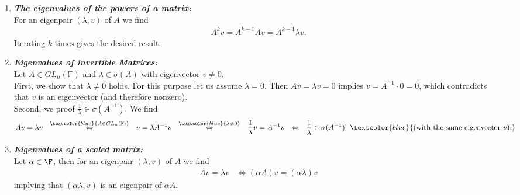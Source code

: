 {
	\color{solution}
\begin{enumerate}
	\item  \textbf{\textit{The eigenvalues of the powers of a matrix:}}\\
	For an eigenpair $(\lambda,v)$ of $A$ we find
 \begin{align*}
 A^kv = A^{k-1}Av =  A^{k-1}\lambda v.
 \end{align*}
 Iterating $k$ times gives the desired result.
	\item	\textbf{\textit{Eigenvalues of invertible Matrices:}}\\ 
	 Let $A\in GL_n(\mathbb{F})$ and $\lambda\in\sigma(A)$ with eigenvector $v\neq 0$.\\
	First, we show that $\lambda\neq 0$ holds. For this purpose let us assume $\lambda = 0$. Then
	$Av=\lambda v=0$ implies $v=A^{-1}\cdot 0=0$, which contradicts that $v$ is an eigenvector (and therefore nonzero).\\
	Second, we proof $\frac{1}{\lambda}\in\sigma(A^{-1})$. We find
	\begin{align*}Av=\lambda v~~\stackrel{\textcolor{blue}{A\in GL_n(\mathbb{F})}}{\Leftrightarrow}~~ v = \lambda A^{-1}v~~\stackrel{\textcolor{blue}{\lambda\neq 0}}{\Leftrightarrow}~~\frac{1}{\lambda}v=A^{-1}v~~\Leftrightarrow~~\frac{1}{\lambda}\in\sigma(A^{-1})~~\textcolor{blue}{(\text{with the same eigenvector}~v).}
	\end{align*}
%
%
%
	\item \textbf{\textit{Eigenvalues of a scaled matrix:}}\\
	Let $\alpha \in \F$, then for an eigenpair $(\lambda,v)$ of $A$ we find
	\begin{align*}
	Av = \lambda v & \Leftrightarrow (\alpha A) v = (\alpha \lambda)  v
	\end{align*} 
	implying that $(\alpha \lambda, v)$ is an eigenpair of $\alpha A$. \\ 



\end{enumerate}}

